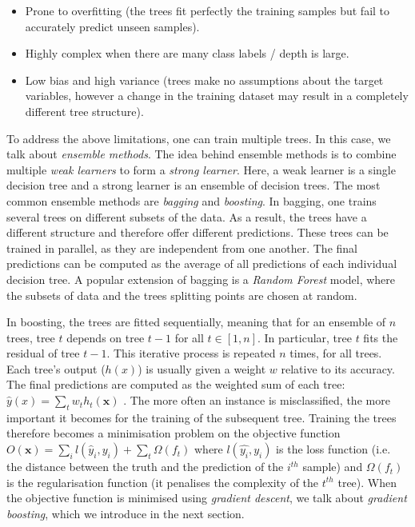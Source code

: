 \begin{itemize}
	\item Prone to overfitting (the trees fit perfectly the training samples but fail to accurately predict unseen samples).
	\item Highly complex when there are many class labels / depth is large.
	\item Low bias and high variance (trees make no assumptions about the target variables, however a change in the training dataset may result in a completely different tree structure).
\end{itemize}

To address the above limitations, one can train multiple trees. In this case, we talk about \textit{ensemble methods}. The idea behind ensemble methods is to combine multiple \textit{weak learners} to form a \textit{strong learner}. Here, a weak learner is a single decision tree and a strong learner is an ensemble of decision trees. The most common ensemble methods are \textit{bagging} and \textit{boosting}. In bagging, one trains several trees on different subsets of the data. As a result, the trees have a different structure and therefore offer different predictions. These trees can be trained in parallel, as they are independent from one another. The final predictions can be computed as the average of all predictions of each individual decision tree. A popular extension of bagging is a \textit{Random Forest} model, where the subsets of data and the trees splitting points are chosen at random.

In boosting, the trees are fitted sequentially, meaning that for an ensemble of $n$ trees, tree $t$ depends on tree $t-1$ for all $t \in [1, n]$. In particular, tree $t$ fits the residual of tree $t-1$. This iterative process is repeated $n$ times, for all trees. Each tree's output ($h(x)$) is usually given a weight $w$ relative to its accuracy. The final predictions are computed as the weighted sum of each tree: $\hat{y}(x) = \sum_t w_t h_t(\textbf{x})$ \cite{woodruff}.  The more often an instance is misclassified, the more important it becomes for the training of the subsequent tree. Training the trees therefore becomes a minimisation problem on the objective function $O(\textbf{x}) = \sum_i l(\hat{y}_i, y_i) + \sum_t \Omega(f_t)$ \cite{xgboost} where $l(\hat{y_i}, y_i)$ is the loss function (i.e. the distance between the truth and the prediction of the $i^{th}$ sample) and $\Omega(f_t)$ is the regularisation function (it penalises the complexity of the $t^{th}$ tree). When the objective function is minimised using \textit{gradient descent}, we talk about \textit{gradient boosting}, which we introduce in the next section.

